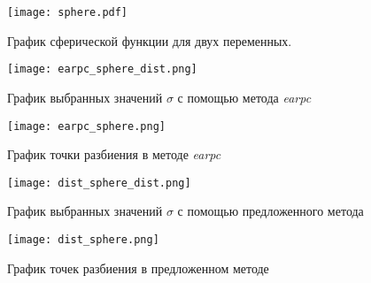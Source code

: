 \begin{figure}
    \centering
    \texttt{[image: sphere.pdf]}
    \caption{График сферической функции для двух переменных.}
    \label{sphere_plot}
\end{figure}

\begin{figure}
    \centering
    \label{earpc_sphere_dist}
    \texttt{[image: earpc\_sphere\_dist.png]}
    \caption{График выбранных значений $\sigma$ с помощью метода \textit{earpc}}
\end{figure}


\begin{figure}
\label{earpc_sphere}
    \centering
    \texttt{[image: earpc\_sphere.png]}
    \caption{График точки разбиения в методе \textit{earpc}}
\end{figure}

\begin{figure}
\label{dist_sphere}
    \centering
    \texttt{[image: dist\_sphere\_dist.png]}
    \caption{График выбранных значений $\sigma$ с помощью предложенного метода}
\end{figure}

\begin{figure}
    \centering
    \texttt{[image: dist\_sphere.png]}
    \caption{График точек разбиения в предложенном методе}
\end{figure}


